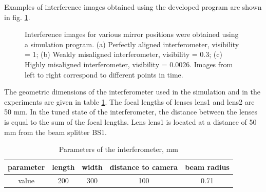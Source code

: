 Examples of interference images obtained using the developed program are shown in fig. \ref{fig:visib_expl}.

\begin{figure}[ht]
    \caption{
    Interference images for various mirror positions were obtained using a simulation program. (a) Perfectly aligned interferometer, visibility = 1; (b) Weakly misaligned interferometer, visibility = 0.3; (c) Highly misaligned interferometer, visibility = 0.0026. Images from left to right correspond to different points in time.}
\label{fig:visib_expl}
\end{figure}

The geometric dimensions of the interferometer used in the simulation and in the experiments are given in table \ref{tab:interf_stat_params}. The focal lengths of lenses lens1 and lens2 are 50 mm. In the tuned state of the interferometer, the distance between the lenses is equal to the sum of the focal lengths. Lens lens1 is located at a distance of 50 mm from the beam splitter BS1.


\begin{table} [htbp]
    \centering
    \begin{threeparttable}%
        \caption{Parameters of the interferometer, mm}
        \begin{tabular}{|c|c|c|c|c|}
            \hline
            \hline
            parameter   & length & width & distance to camera & beam radius \\
            \hline
            value & 200 & 300 & 100 & 0.71 \\
            \hline
            \hline
        \end{tabular}
        \label{tab:interf_stat_params}
    \end{threeparttable}
\end{table}

